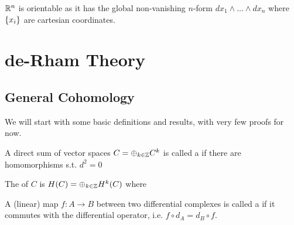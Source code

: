 \documentclass{article}
\begin{document}
\begin{example}
	$\mathbb{R}^n$ is orientable as it has the global non-vanishing $n$-form $dx_1 \wedge \dots \wedge dx_n$ where $\left\{ x_i \right\}$ are cartesian coordinates.  
\end{example}


\section{de-Rham Theory}
\subsection{General Cohomology}
We will start with some basic definitions and results, with very few proofs for now. 

\begin{definition}
	A direct sum of vector spaces $C = \oplus_{k \in \mathbb{Z}} C^k$ is called a  if there are homomorphisms
	s.t. $d^2=0$
\end{definition}

\begin{definition}
	The  of $C$ is $H(C) = \oplus_{k \in \mathbb{Z}} H^k(C)$ where 
\end{definition}

\begin{definition}
	A (linear) map $f:A \to B$ between two differential complexes is called a  if it commutes with the differential operator, i.e. $f \circ d_A = d_B \circ f$. 	
\end{definition}
\end{document}
